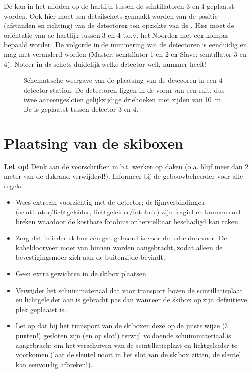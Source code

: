 De \gps kan in het midden op de hartlijn tussen de scintillatoren 3 en 4
geplaatst worden. Ook hier moet een detailschets gemaakt worden van de
positie (afstanden en richting) van de detectoren ten opzichte van de
\gps. Hier moet de oriëntatie van de hartlijn tussen 3 en 4 t.o.v.
het Noorden met een kompas bepaald worden. De volgorde in de nummering
van de detectoren is eenduidig en mag niet veranderd worden (Master:
scintillator 1 en 2 en Slave: scintillator 3 en 4). Noteer in de schets
duidelijk welke detector welk nummer heeft!

\begin{figure}
    \centering
    
    \caption{Schematische weergave van de plaatsing van de detecoren in een
             4-detector station. De detectoren liggen in de vorm van een
             ruit, dus twee aaneengesloten gelijkzijdige driehoeken met
             zijden van \SI{10}{\meter}. De \gps is geplaatst tussen
             detector 3 en 4.}
    \label{fig:station-4-layout}
\end{figure}


\section{Plaatsing van de skiboxen}

\textbf{Let op!} Denk aan de voorschriften m.b.t. werken op daken (o.a.
blijf meer dan 2 meter van de dakrand verwijderd!). Informeer bij de
gebouwbeheerder voor alle regels.

\begin{itemize}
    \item Wees extreem voorzichtig met de detector; de lijmverbindingen
    (scintillator/lichtgeleider, lichtgeleider/fotobuis) zijn fragiel
    en kunnen snel breken waardoor de kostbare fotobuis onherstelbaar
    beschadigd kan raken.
    \item Zorg dat in ieder skibox één gat geboord is voor de
    kabeldoorvoer. De kabeldoorvoer moet van binnen worden aangebracht,
    zodat alleen de bevestigingsmoer zich aan de buitenzijde bevindt.
    \item Geen extra gewichten in de skibox plaatsen.
    \item Verwijder het schuimmateriaal dat voor transport
    boven de scintillatieplaat en lichtgeleider aan is gebracht pas
    dan wanneer de skibox op zijn definitieve plek geplaatst is.
    \item Let op dat bij het transport van de skiboxen deze op de juiste
    wijze (3 punten!) gesloten zijn (en op slot!) terwijl voldoende
    schuimmateriaal is aangebracht om het verschuiven van de
    scintillatieplaat en lichtgeleider te voorkomen (laat de sleutel
    nooit in het slot van de skibox zitten, de sleutel kan eenvoudig
    afbreken!).
\end{itemize}

